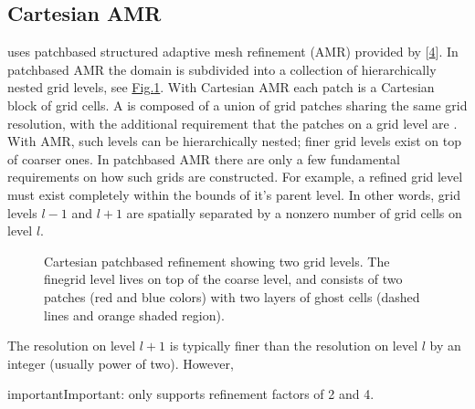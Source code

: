 \documentclass[letterpaper,10pt,english]{sphinxmanual}
\let\sphinxpxdimen\pdfpxdimen\else\newdimen\sphinxpxdimen
\begin{document}
\subsection{Cartesian AMR}
\label{\detokenize{Source/SpatialDiscretization:cartesian-amr}}
\sphinxAtStartPar
{} uses patch\sphinxhyphen{}based structured adaptive mesh refinement (AMR) provided by  {[}\hyperlink{cite.ZZReferences:id82}{4}{]}.
In patch\sphinxhyphen{}based AMR the domain is subdivided into a collection of hierarchically nested grid levels, see \hyperref[\detokenize{Source/SpatialDiscretization:fig-patchbasedamr}]{Fig.\@ \ref{\detokenize{Source/SpatialDiscretization:fig-patchbasedamr}}}.
With Cartesian AMR each patch is a Cartesian block of grid cells.
A  is composed of a union of grid patches sharing the same grid resolution, with the additional requirement that the patches on a grid level are .
With AMR, such levels can be hierarchically nested; finer grid levels exist on top of coarser ones.
In patch\sphinxhyphen{}based AMR there are only a few fundamental requirements on how such grids are constructed.
For example, a refined grid level must exist completely within the bounds of it’s parent level.
In other words, grid levels \(l-1\) and \(l+1\) are spatially separated by a non\sphinxhyphen{}zero number of grid cells on level \(l\).

\begin{figure}[htb]
\centering
\capstart

\noindent\sphinxincludegraphics[width=480\sphinxpxdimen]{{PatchBasedAMR}.png}
\caption{Cartesian patch\sphinxhyphen{}based refinement showing two grid levels.
The fine\sphinxhyphen{}grid level lives on top of the coarse level, and consists of two patches (red and blue colors) with two layers of ghost cells (dashed lines and orange shaded region).}\label{\detokenize{Source/SpatialDiscretization:id6}}\label{\detokenize{Source/SpatialDiscretization:fig-patchbasedamr}}\end{figure}

\sphinxAtStartPar
The resolution on level \(l+1\) is typically finer than the resolution on level \(l\) by an integer (usually power of two).
However,

\begin{sphinxadmonition}{important}{Important:}
\sphinxAtStartPar
{} only supports refinement factors of 2 and 4.
\end{sphinxadmonition}
\end{document}
